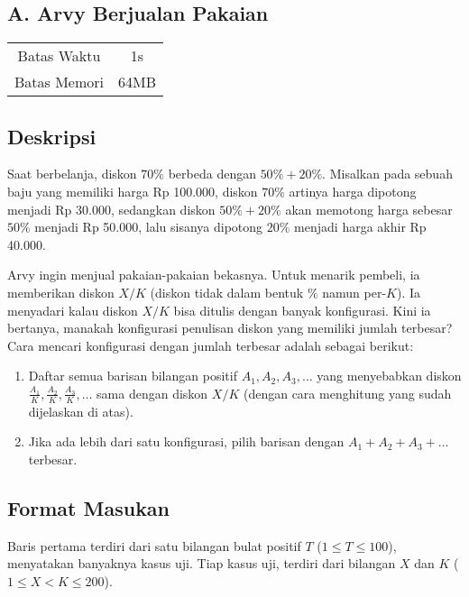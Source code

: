 \documentclass{article}
\begin{document}
\begin{center}
    \section*{A. Arvy Berjualan Pakaian} %

    \begin{tabular}{ | c c | }
        \hline
        Batas Waktu  & 1s \\    %
        Batas Memori & 64MB \\  %
        \hline
    \end{tabular}
\end{center}

\subsection*{Deskripsi}

Saat berbelanja, diskon $70\%$ berbeda dengan $50\% + 20\%$.
Misalkan pada sebuah baju yang memiliki harga Rp 100.000, diskon $70\%$ artinya harga dipotong menjadi Rp 30.000, sedangkan diskon $50\% + 20\%$ akan memotong harga sebesar $50\%$ menjadi Rp 50.000, lalu sisanya dipotong $20\%$ menjadi harga akhir Rp 40.000.

Arvy ingin menjual pakaian-pakaian bekasnya.
Untuk menarik pembeli, ia memberikan diskon $X / K$ (diskon tidak dalam bentuk $\%$ namun per-$K$).
Ia menyadari kalau diskon $X / K$ bisa ditulis dengan banyak konfigurasi.
Kini ia bertanya, manakah konfigurasi penulisan diskon yang memiliki jumlah terbesar?
Cara mencari konfigurasi dengan jumlah terbesar adalah sebagai berikut:
\begin{enumerate}
    \item Daftar semua barisan bilangan positif $A_1, A_2, A_3, \dots$ yang menyebabkan diskon $\frac{A_1}{K}, \frac{A_2}{K}, \frac{A_3}{K} , \dots $ sama dengan diskon $X / K$ (dengan cara menghitung yang sudah dijelaskan di atas).
    \item Jika ada lebih dari satu konfigurasi, pilih barisan dengan $A_1 + A_2 + A_3 + \dots $ terbesar.
\end{enumerate}

\subsection*{Format Masukan}

Baris pertama terdiri dari satu bilangan bulat positif $T$ ($1 \leq T \leq 100$), menyatakan banyaknya kasus uji.
Tiap kasus uji, terdiri dari bilangan $X$ dan $K$ ($1 \leq X < K \leq 200$).
\end{document}
